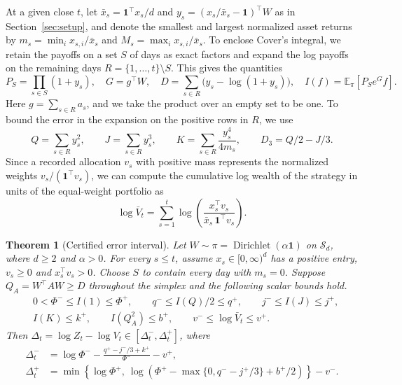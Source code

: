 \documentclass{article}
\numberwithin{equation}{section}
\newtheorem{theorem}{Theorem}[section]
\theoremstyle{remark}
\newcommand{\E}{\mathbb E}
\newcommand{\one}{\mathbf 1}
\begin{document}
At a given close $t$, let $\bar x_s=\one^\top x_s/d$ and
$y_s=(x_s/\bar x_s-\one)^\top W$ as in Section~\ref{sec:setup}, and
denote the smallest and largest normalized asset returns by
$m_s=\min_i x_{s,i}/\bar x_s$ and $M_s=\max_i x_{s,i}/\bar x_s$.
To enclose Cover's integral, we retain the payoffs on a set $S$ of days
as exact factors and expand the log payoffs on the remaining days
$R=\{1,\ldots,t\}\setminus S$. This gives the quantities
\[
 P_S=\prod_{s\in S}(1+y_s),\quad G=g^\top W,\quad
 D=\sum_{s\in R}\bigl(y_s-\log(1+y_s)\bigr),\quad
 I(f)=\E_\pi[P_S e^G f].
\]
Here $g=\sum_{s\in R}a_s$, and we take the product over an empty set
to be one. To bound the error in the expansion on the positive rows
in $R$, we use
\[
 Q=\sum_{s\in R}y_s^2,\qquad J=\sum_{s\in R}y_s^3,\qquad
 K=\sum_{s\in R}\frac{y_s^4}{4m_s},\qquad D_3=Q/2-J/3 .
\]
Since a recorded allocation $v_s$ with positive mass represents the
normalized weights $v_s/(\one^\top v_s)$, we can compute the cumulative
log wealth of the strategy in units of the equal-weight portfolio as
\begin{equation}
 \log\bar V_t=\sum_{s=1}^t\log\!\left(
        \frac{x_s^\top v_s}{\bar x_s\,\one^\top v_s}\right).
 \label{eq:played-log}
\end{equation}

\begin{theorem}[Certified error interval]\label{thm:main}
Let $W\sim\pi=\operatorname{Dirichlet}(\alpha\one)$ on $\mathcal S_d$,
where $d\ge2$ and $\alpha>0$. For every $s\le t$, assume
$x_s\in[0,\infty)^d$ has a positive entry, $v_s\ge0$ and
$x_s^\top v_s>0$. Choose $S$ to contain every day with $m_s=0$.
Suppose $Q_A=W^\top A W\ge D$ throughout the simplex and
the following scalar bounds hold.
\[
\begin{aligned}
 &0<\Phi^-\le I(1)\le\Phi^+, \qquad
 q^-\le I(Q)/2\le q^+, \qquad j^-\le I(J)\le j^+,\\
 &I(K)\le k^+, \qquad I(Q_A^2)\le b^+,\qquad
 v^-\le\log\bar V_t\le v^+ .
\end{aligned}
\]
Then $\Delta_t=\log Z_t-\log V_t\in[\Delta_t^-,\Delta_t^+]$, where
\begin{equation}
\begin{aligned}
 \Delta_t^- &= \log\Phi^- -
               \frac{q^+-j^-/3+k^+}{\Phi^-}-v^+,\\
 \Delta_t^+ &= \min\!\left\{\log\Phi^+,
    \ \log\!\left(\Phi^+-\max\{0,q^- - j^+/3\}+b^+/2\right)\right\}-v^- .
\end{aligned}
\label{eq:tilted-endpoints}
\end{equation}
\end{theorem}
\end{document}
